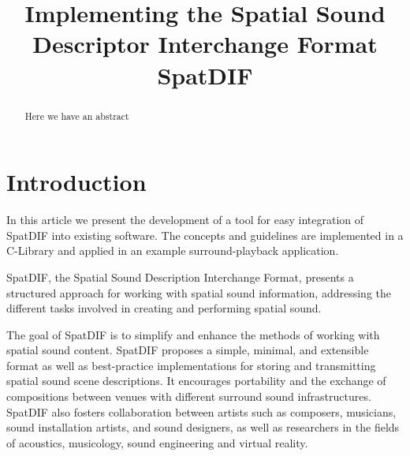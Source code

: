 \documentclass[a4paper]{article}
\title{Implementing the Spatial Sound Descriptor Interchange Format SpatDIF}
\begin{document}
%
\sloppy
\makeatletter 
\def\ps@myheadings{%
\let\ps@jpl@in\ps@plain%
\def\@evenhead{\reset@font\hfil\leftmark\hfil}%
\def\@oddhead{\reset@font\hfil\rightmark\hfil}%
\let\@mkboth\@gobbletwo%
\let\sectionmark\@gobble%
\let\subsectionmark\@gobble%
% 
\def\@oddfoot{\reset@font\hfil-- \thepage --\hfil}%
\let\@evenfoot\@oddfoot 
} 
\makeatother 
\setcounter{page}{17} 
\pagestyle{myheadings} 
\maketitle
\thispagestyle{myheadings}

\begin{abstract}

Here we have an abstract

\end{abstract}


\section{Introduction}

In this article we present the development of a tool for easy integration of SpatDIF into existing software.
The concepts and guidelines are implemented in a C-Library and applied in an example surround-playback application.

SpatDIF, the Spatial Sound Description Interchange Format, presents a structured approach for working with spatial sound information, addressing the different tasks involved in creating and performing spatial sound.

The goal of SpatDIF is to simplify and enhance the methods of working with spatial sound content. 
SpatDIF proposes a simple, minimal, and extensible format as well as best-practice implementations for storing and transmitting spatial sound scene descriptions. 
It encourages portability and the exchange of compositions between venues with different surround sound infrastructures. 
SpatDIF also fosters collaboration between artists such as composers, musicians, sound installation artists, and sound designers, as well as researchers in the fields of acoustics, musicology, sound engineering and virtual reality.
\end{document}
